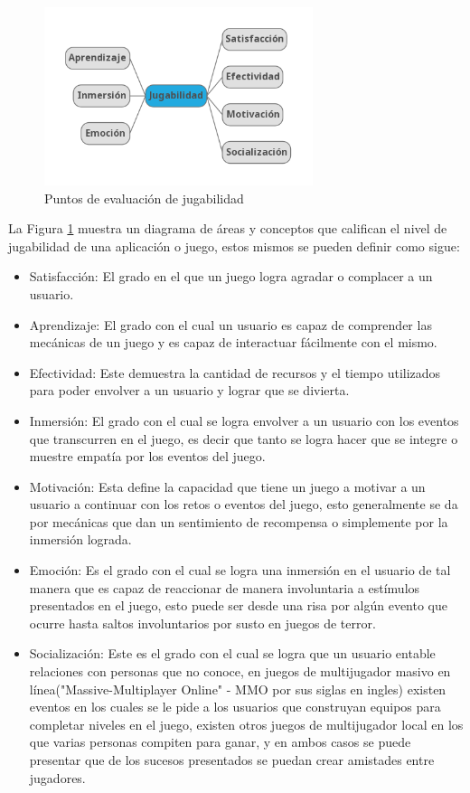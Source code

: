 \begin{figure}
    \centering
    \includegraphics[width=0.7\textwidth]{img/playabilityv2.png}
    \caption{Puntos de evaluación de jugabilidad}
    \label{figure:playability}
\end{figure}

La Figura \ref{figure:playability} muestra un diagrama de áreas y conceptos que
califican el nivel de jugabilidad de una aplicación o juego, estos mismos se
pueden definir como sigue:

\begin{itemize}
    \item Satisfacción: El grado en el que un juego logra agradar o complacer a
    un usuario.
    \item Aprendizaje: El grado con el cual un usuario es capaz de comprender
    las mecánicas de un juego y es capaz de interactuar fácilmente con el mismo.
    \item Efectividad: Este demuestra la cantidad de recursos y el tiempo
    utilizados para poder envolver a un usuario y lograr que se divierta.
    \item Inmersión: El grado con el cual se logra envolver a un usuario con los
    eventos que transcurren en el juego, es decir que tanto se logra hacer que
    se integre o muestre empatía por los eventos del juego.
    \item Motivación: Esta define la capacidad que tiene un juego a motivar a un
    usuario a continuar con los retos o eventos del juego, esto generalmente se
    da por mecánicas que dan un sentimiento de recompensa o simplemente por la
    inmersión lograda.
    \item Emoción: Es el grado con el cual se logra una inmersión en el usuario
    de tal manera que es capaz de reaccionar de manera involuntaria a estímulos
    presentados en el juego, esto puede ser desde una risa por algún evento que
    ocurre hasta saltos involuntarios por susto en juegos de terror.
    \item Socialización: Este es el grado con el cual se logra que un usuario
    entable relaciones con personas que no conoce, en juegos de multijugador
    masivo en línea("Massive-Multiplayer Online" - MMO por sus siglas en ingles)
    existen eventos en los cuales se le pide a los usuarios que construyan
    equipos para completar niveles en el juego, existen otros juegos de
    multijugador local en los que varias personas compiten para ganar, y en
    ambos casos se puede presentar que de los sucesos presentados se puedan
    crear amistades entre jugadores.\cite{sanchez2009playability}
\end{itemize}

